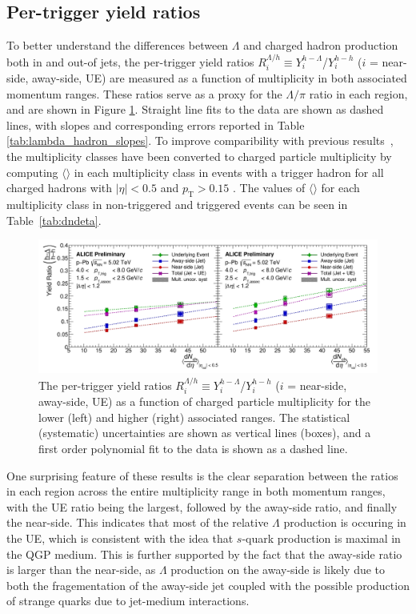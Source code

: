 \subsection{Per-trigger yield ratios}

To better understand the differences between $\Lambda$ and charged hadron production both in and out-of jets, the per-trigger yield ratios $R_{i}^{\Lambda/h} \equiv Y_{i}^{h-\Lambda}$/$Y_{i}^{h-h}$ ($i$ = near-side, away-side, UE) are measured as a function of multiplicity in both associated momentum ranges. These ratios serve as a proxy for the $\Lambda/\pi$ ratio in each region, and are shown in Figure \ref{fig:lambda_hadron_ratio}. Straight line fits to the data are shown as dashed lines, with slopes and corresponding errors reported in Table \ref{tab:lambda_hadron_slopes}. To improve comparibility with previous results~\cite{ALICEpPbEnhancement,ALICEppEnhancement}, the multiplicity classes have been converted to charged particle multiplicity by computing $\langle$\dndeta$\rangle$ in each multiplicity class in events with a trigger hadron for all charged hadrons with $|\eta| < 0.5$ and $p_{\text{T}} > 0.15$ \GeVc. The values of $\langle$\dndeta$\rangle$ for each multiplicity class in non-triggered and triggered events can be seen in Table~\ref{tab:dndeta}.

\begin{figure}[h!]
\centering
\includegraphics[width=\textwidth]{figures/results/ratio_plot_dndeta.png}
\caption{The per-trigger yield ratios $R_{i}^{\Lambda/h} \equiv Y_{i}^{h-\Lambda}$/$Y_{i}^{h-h}$ ($i$ = near-side, away-side, UE) as a function of charged particle multiplicity for the lower (left) and higher (right) associated \pt ranges. The statistical (systematic) uncertainties are shown as vertical lines (boxes), and a first order polynomial fit to the data is shown as a dashed line.}
\label{fig:lambda_hadron_ratio}
\end{figure}

One surprising feature of these results is the clear separation between the ratios in each region across the entire multiplicity range in both momentum ranges, with the UE ratio being the largest, followed by the away-side ratio, and finally the near-side. This indicates that most of the relative $\Lambda$ production is occuring in the UE, which is consistent with the idea that $s$-quark production is maximal in the QGP medium. This is further supported by the fact that the away-side ratio is larger than the near-side, as $\Lambda$ production on the away-side is likely due to both the fragementation of the away-side jet coupled with the possible production of strange quarks due to jet-medium interactions. 

